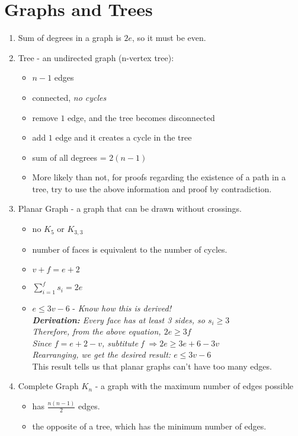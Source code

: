 \documentclass[a4paper]{article}
\begin{document}
\section{Graphs and Trees} 
\begin{enumerate}
	\item Sum of degrees in a graph is $2e$, so it must be even.
	\item Tree - an undirected graph (n-vertex tree):
		\begin{itemize}
			\item $n-1$ edges
			\item connected, \textit{no cycles}
			\item remove $1$ edge, and the tree becomes disconnected
			\item add $1$ edge and it creates a cycle in the tree
			\item sum of all degrees = $2(n-1)$
			\item More likely than not, for proofs regarding the existence of a path in a tree, try to use the above information and proof by contradiction.
		\end{itemize}
	\item Planar Graph - a graph that can be drawn without crossings. 
		\begin{itemize}
			\item no $K_5$ or $K_{3,3}$
			\item number of faces is equivalent to the number of cycles.
			\item $v + f = e + 2$
			\item $\sum_{i=1}^{f} s_{i} = 2e$
			\item $e \leq 3v - 6$ - \textit{Know how this is derived!\\ \textbf{Derivation:} Every face has at least 3 sides, so $s_i \geq 3$ \\Therefore, from the above equation, $2e \geq 3f$\\Since $f = e + 2 - v$, subtitute f $\Rightarrow 2e \geq 3e + 6 - 3v$ \\ Rearranging, we get the desired result: $e \leq 3v - 6$ }\\
			This result tells us that planar graphs can't have too many edges.
		\end{itemize}
	\item Complete Graph \textit{$K_n$} - a graph with the maximum number of edges possible
		\begin{itemize}
			\item has $\frac{n(n - 1)}{2}$ edges.
			\item the opposite of a tree, which has the minimum number of edges.

\end{itemize}
\end{enumerate}
\end{document}
